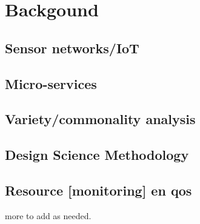 \chapter{Backgound}
\section{Sensor networks/IoT}
\section{Micro-services}
\section{Variety/commonality analysis}
\section{Design Science Methodology}
\section{Resource [monitoring] en qos} 
more to add as needed.
